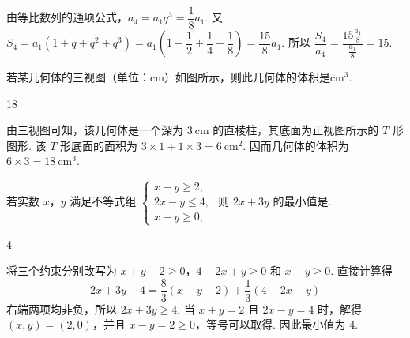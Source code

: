 \begin{solution}
由等比数列的通项公式，\(a_4=a_1q^3=\dfrac18a_1\). 又 \(S_4=a_1(1+q+q^2+q^3)=a_1\left(1+\dfrac12+\dfrac14+\dfrac18\right)=\dfrac{15}{8}a_1\). 所以 \(\dfrac{S_4}{a_4}=\dfrac{15\frac{a_1}{8}}{\frac{a_1}{8}}=15\).
\end{solution}

\begin{problem}
若某几何体的三视图（单位：\(\mathrm{cm}\)）如图所示，则此几何体的体积是\fillinblank{}\(\mathrm{cm}^3\).

\end{problem}

\begin{answer}
18
\end{answer}

\begin{solution}
由三视图可知，该几何体是一个深为 \(3\mathrm{~cm}\) 的直棱柱，其底面为正视图所示的 \(T\) 形图形. 该 \(T\) 形底面的面积为 \(3\times1+1\times3=6\mathrm{~cm}^2\). 因而几何体的体积为 \(6\times3=18\mathrm{~cm}^3\).
\end{solution}

\begin{problem}
若实数 \(x\)，\(y\) 满足不等式组 \(\begin{cases}
x+y\geqslant 2,\\
2x-y\leqslant 4,\\
x-y\geqslant 0,
\end{cases}\) 则 \(2x+3y\) 的最小值是\fillinblank{}.
\end{problem}

\begin{answer}
4
\end{answer}

\begin{solution}
将三个约束分别改写为 \(x+y-2\geqslant0\)，\(4-2x+y\geqslant0\) 和 \(x-y\geqslant0\). 直接计算得
\[
2x+3y-4=\frac83(x+y-2)+\frac13(4-2x+y)
\]
右端两项均非负，所以 \(2x+3y\geqslant4\). 当 \(x+y=2\) 且 \(2x-y=4\) 时，解得 \((x,y)=(2,0)\)，并且 \(x-y=2\geqslant0\)，等号可以取得. 因此最小值为 \(4\).
\end{solution}

